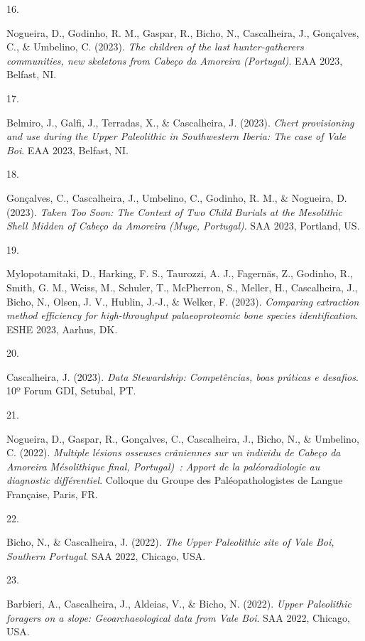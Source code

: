 \documentclass[11pt,a4paper,]{awesome-cv}
\newlength{\cslhangindent}
\newlength{\csllabelwidth}
\newenvironment{CSLReferences}[2] %
 {\begin{list}{}{%
  \setlength{\itemindent}{0pt}
  \setlength{\leftmargin}{0pt}
  \setlength{\parsep}{0pt}
  \ifodd #1
   \setlength{\leftmargin}{\cslhangindent}
   \setlength{\itemindent}{-1\cslhangindent}
  \fi
  \setlength{\itemsep}{#2\baselineskip}}}
 {\end{list}}
\newcommand{\CSLLeftMargin}[1]{\parbox[t]{\csllabelwidth}{\strut#1\strut}}
\newcommand{\CSLRightInline}[1]{\parbox[t]{\linewidth - \csllabelwidth}{\strut#1\strut}}
\begin{document}
\begin{CSLReferences}{0}{0}
\CSLLeftMargin{16. }%
\CSLRightInline{Nogueira, D., Godinho, R. M., Gaspar, R., Bicho, N.,
Cascalheira, J., Gonçalves, C., \& Umbelino, C. (2023). \emph{The
children of the last hunter-gatherers communities, new skeletons from
Cabeço da Amoreira (Portugal)}. EAA 2023, Belfast, NI.}

\CSLLeftMargin{17. }%
\CSLRightInline{Belmiro, J., Galfi, J., Terradas, X., \& Cascalheira, J.
(2023). \emph{Chert provisioning and use during the Upper Paleolithic in
Southwestern Iberia: The case of Vale Boi}. EAA 2023, Belfast, NI.}

\CSLLeftMargin{18. }%
\CSLRightInline{Gonçalves, C., Cascalheira, J., Umbelino, C., Godinho,
R. M., \& Nogueira, D. (2023). \emph{Taken Too Soon: The Context of Two
Child Burials at the Mesolithic Shell Midden of Cabeço da Amoreira
(Muge, Portugal)}. SAA 2023, Portland, US.}

\CSLLeftMargin{19. }%
\CSLRightInline{Mylopotamitaki, D., Harking, F. S., Taurozzi, A. J.,
Fagernäs, Z., Godinho, R., Smith, G. M., Weiss, M., Schuler, T.,
McPherron, S., Meller, H., Cascalheira, J., Bicho, N., Olsen, J. V.,
Hublin, J.-J., \& Welker, F. (2023). \emph{Comparing extraction method
efficiency for high-throughput palaeoproteomic bone species
identification}. ESHE 2023, Aarhus, DK.}

\CSLLeftMargin{20. }%
\CSLRightInline{Cascalheira, J. (2023). \emph{Data Stewardship:
Competências, boas práticas e desafios}. 10º Forum GDI, Setubal, PT.}

\CSLLeftMargin{21. }%
\CSLRightInline{Nogueira, D., Gaspar, R., Gonçalves, C., Cascalheira,
J., Bicho, N., \& Umbelino, C. (2022). \emph{Multiple lésions osseuses
crâniennes sur un individu de Cabeço da Amoreira Mésolithique final,
Portugal)~: Apport de la paléoradiologie au diagnostic différentiel}.
Colloque du Groupe des Paléopathologistes de Langue Française, Paris,
FR.}

\CSLLeftMargin{22. }%
\CSLRightInline{Bicho, N., \& Cascalheira, J. (2022). \emph{The Upper
Paleolithic site of Vale Boi, Southern Portugal}. SAA 2022, Chicago,
USA.}

\CSLLeftMargin{23. }%
\CSLRightInline{Barbieri, A., Cascalheira, J., Aldeias, V., \& Bicho, N.
(2022). \emph{Upper Paleolithic foragers on a slope: Geoarchaeological
data from Vale Boi}. SAA 2022, Chicago, USA.}


\end{CSLReferences}
\end{document}
